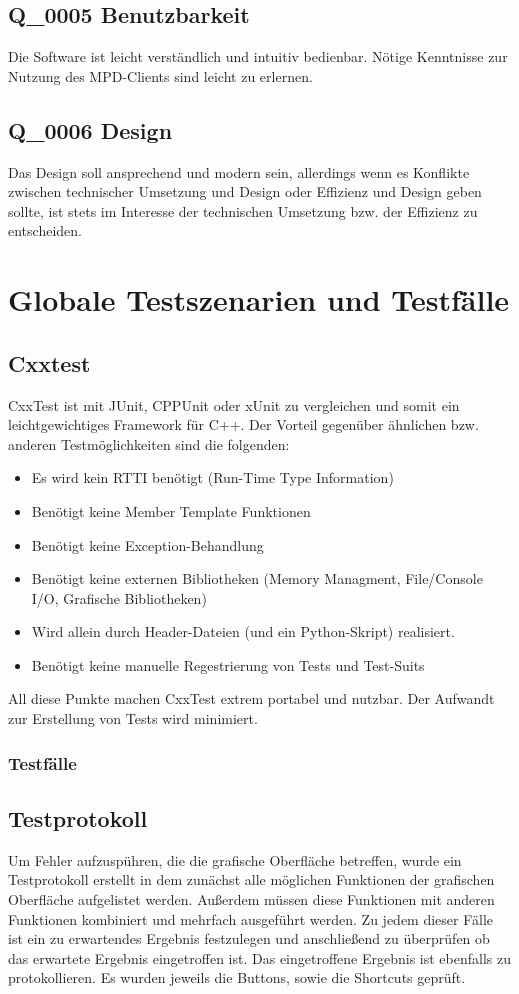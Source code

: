 \subsection{Q\_0005 Benutzbarkeit}
Die Software ist leicht verständlich und intuitiv bedienbar. Nötige Kenntnisse zur Nutzung des 
MPD-Clients sind leicht zu erlernen.
\subsection{Q\_0006 Design}
Das Design soll ansprechend und modern sein, allerdings wenn es Konflikte zwischen technischer Umsetzung 
und Design oder Effizienz und Design geben sollte, ist stets im Interesse der technischen Umsetzung bzw. 
der Effizienz zu entscheiden.
\section{Globale Testszenarien und Testfälle}
\subsection{Cxxtest}
CxxTest ist mit JUnit, CPPUnit oder xUnit zu vergleichen und somit ein leichtgewichtiges Framework für C++.
Der Vorteil gegenüber ähnlichen bzw. anderen Testmöglichkeiten sind die folgenden:
\begin{itemize}
	\item Es wird kein RTTI benötigt (Run-Time Type Information)
	\item Benötigt keine Member Template Funktionen
	\item Benötigt keine Exception-Behandlung
	\item Benötigt keine externen Bibliotheken (Memory Managment, File/Console I/O, Grafische Bibliotheken)
	\item Wird allein durch Header-Dateien (und ein Python-Skript) realisiert.
	\item Benötigt keine manuelle Regestrierung von Tests und Test-Suits
\end{itemize}
All diese Punkte machen CxxTest extrem portabel und nutzbar. Der Aufwandt zur Erstellung von Tests
wird minimiert.
\subsubsection{Testfälle}
\subsection{Testprotokoll}
Um Fehler aufzuspühren, die die grafische Oberfläche betreffen, wurde ein Testprotokoll erstellt in dem zunächst
alle möglichen Funktionen der grafischen Oberfläche aufgelistet werden. Außerdem müssen diese Funktionen mit 
anderen Funktionen kombiniert und mehrfach ausgeführt werden. Zu jedem dieser Fälle ist ein zu erwartendes Ergebnis
festzulegen und anschließend zu überprüfen ob das erwartete Ergebnis eingetroffen ist. Das eingetroffene Ergebnis
ist ebenfalls zu protokollieren. Es wurden jeweils die Buttons, sowie die Shortcuts geprüft.
